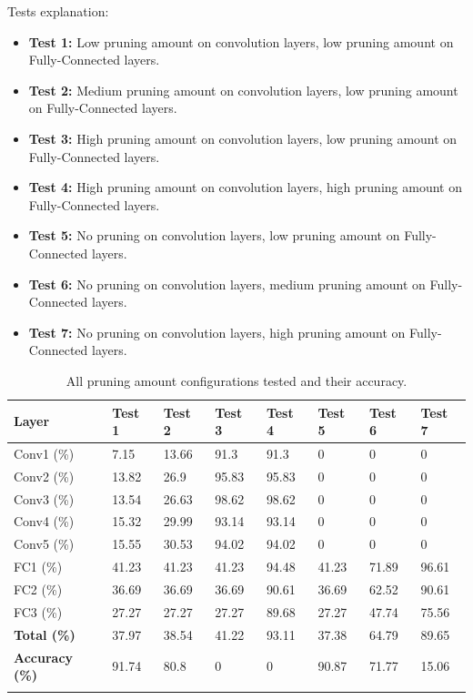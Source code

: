 Tests explanation:
\begin{itemize}
	\item \textbf{Test 1:} Low pruning amount on convolution layers, low pruning amount on Fully-Connected layers.
	\item \textbf{Test 2:} Medium pruning amount on convolution layers, low pruning amount on Fully-Connected layers.
	\item \textbf{Test 3:} High pruning amount on convolution layers, low pruning amount on Fully-Connected layers.
	\item \textbf{Test 4:} High pruning amount on convolution layers, high pruning amount on Fully-Connected layers.
	\item \textbf{Test 5:} No pruning on convolution layers, low pruning amount on Fully-Connected layers.
	\item \textbf{Test 6:} No pruning on convolution layers, medium pruning amount on Fully-Connected layers.
	\item \textbf{Test 7:} No pruning on convolution layers, high pruning amount on Fully-Connected layers.
\end{itemize}

\begin{table}[H]
	\caption{All pruning amount configurations tested and their accuracy.}
	\label{tab:pruning-amount-vs-accuracy}
	\centering
	\begin{tabular}{llll llll}
		\toprule
		\textbf{Layer} & \textbf{Test 1} & \textbf{Test 2} & \textbf{Test 3} & \textbf{Test 4} & \textbf{Test 5} & \textbf{Test 6} & \textbf{Test 7}\\
		\midrule
			Conv1 (\%) & 7.15 & 13.66 & 91.3 & 91.3 & 0 & 0 & 0 \\
			Conv2 (\%) & 13.82 & 26.9 & 95.83 & 95.83 & 0 & 0 & 0 \\
			Conv3 (\%) & 13.54 & 26.63 & 98.62 & 98.62 & 0 & 0 & 0 \\
			Conv4 (\%) & 15.32 & 29.99 & 93.14 & 93.14 & 0 & 0 & 0 \\
			Conv5 (\%) & 15.55 & 30.53 & 94.02 & 94.02 & 0 & 0 & 0 \\
			FC1 (\%) & 41.23 & 41.23 & 41.23 & 94.48 & 41.23 & 71.89 & 96.61 \\
			FC2 (\%) & 36.69 & 36.69 & 36.69 & 90.61 & 36.69 & 62.52 & 90.61 \\
			FC3 (\%) & 27.27 & 27.27 & 27.27 & 89.68 & 27.27 & 47.74 & 75.56 \\
			\midrule
			\textbf{Total (\%)} & 37.97	& 38.54 & 41.22 & 93.11 & 37.38 & 64.79 & 89.65 \\
			\midrule
			\textbf{Accuracy (\%)} & 91.74	& 80.8 & 0 & 0 & 90.87 & 71.77 & 15.06 \\
		\bottomrule\\
	\end{tabular}
\end{table}

